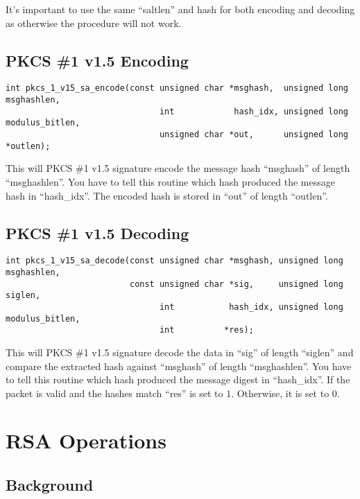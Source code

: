 \documentclass[a4paper]{book}
\begin{document}
It's important to use the same ``saltlen'' and hash for both encoding and decoding as otherwise the procedure will not work.

\subsection{PKCS \#1 v1.5 Encoding}

\begin{verbatim}
int pkcs_1_v15_sa_encode(const unsigned char *msghash,  unsigned long msghashlen,
                               int            hash_idx, unsigned long modulus_bitlen,
                               unsigned char *out,      unsigned long *outlen);
\end{verbatim}

This will PKCS \#1 v1.5 signature encode the message hash ``msghash''  of length ``msghashlen''.  You have
to tell this routine which hash produced the message hash in ``hash\_idx''.  The encoded hash is stored
in ``out'' of length ``outlen''.

\subsection{PKCS \#1 v1.5 Decoding}

\begin{verbatim}
int pkcs_1_v15_sa_decode(const unsigned char *msghash, unsigned long msghashlen,
                         const unsigned char *sig,     unsigned long siglen,
                               int           hash_idx, unsigned long modulus_bitlen, 
                               int          *res);
\end{verbatim}

This will PKCS \#1 v1.5 signature decode the data in ``sig'' of length ``siglen'' and compare the extracted
hash against ``msghash'' of length ``msghashlen''.  You have to tell this routine which hash produced the
message digest in ``hash\_idx''.  If the packet is valid and the hashes match ``res'' is set to $1$.  Otherwise,
it is set to $0$.

\section{RSA Operations}
\subsection{Background}
\end{document}
